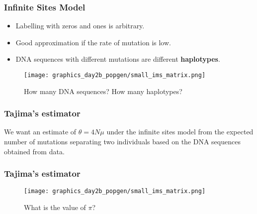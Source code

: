 \documentclass{beamer}
\newcommand{\1}{\ensuremath{\mathbf{1}}}
\begin{document}
%
%
%
\begin{frame}\frametitle{Infinite Sites Model}
	\begin{itemize}
		\item Labelling with zeros and ones is arbitrary.
		\item Good approximation if the rate of mutation is low.
		\item DNA sequences with different mutations are different \textbf{haplotypes}.
	\end{itemize}
	\begin{figure}
	\begin{center}
		\texttt{[image: graphics\_day2b\_popgen/small\_ims\_matrix.png]}
	\end{center}
	\caption{How many DNA sequences? How many haplotypes?}
	\end{figure}
\end{frame}
%
%
%
\begin{frame}\frametitle{Tajima’s estimator}
	We want an estimate of $\theta = 4N\mu$ under the infinite sites model from the expected number of mutations separating two individuals based on the DNA sequences obtained from data.\\[2ex]
\end{frame}
%
%
%
\begin{frame}\frametitle{Tajima’s estimator}
	\begin{figure}
	\begin{center}
		\texttt{[image: graphics\_day2b\_popgen/small\_ims\_matrix.png]}
	\end{center}
	\caption{What is the value of $\pi$?}
	\end{figure}
\end{frame}
\end{document}
